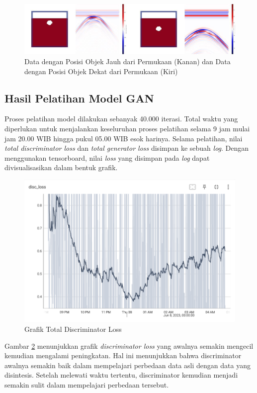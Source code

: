 \documentclass[conference]{IEEEtran}
\begin{document}
\begin{figure}[ht]
  \centering
  \includegraphics[scale=0.2]{gambar/variasi kedalaman.png}
  \caption{Data dengan Posisi Objek Jauh dari Permukaan (Kanan) dan Data dengan Posisi Objek Dekat dari Permukaan (Kiri)}
  \label{fig:posisiData}
\end{figure}

\subsection{Hasil Pelatihan Model GAN}

Proses pelatihan model dilakukan sebanyak 40.000 iterasi. 
Total waktu yang diperlukan untuk menjalankan keseluruhan proses pelatihan selama 9 jam mulai jam 20.00 WIB hingga pukul 05.00 WIB esok harinya. 
Selama pelatihan, nilai \emph{total discriminator loss} dan \emph{total generator loss} disimpan ke sebuah \emph{log}. 
Dengan menggunakan tensorboard, nilai \emph{loss} yang disimpan pada \emph{log} dapat divisualisasikan dalam bentuk grafik. 

\begin{figure}[ht]
  \centering
  \includegraphics[scale=0.4]{gambar/Disc_loss.png}
  \caption{Grafik Total Discriminator Loss}
  \label{fig:discLoss}
\end{figure}

Gambar \ref{fig:discLoss} menunjukkan grafik \emph{discriminator loss} yang awalnya semakin mengecil kemudian mengalami peningkatan. 
Hal ini menunjukkan bahwa discriminator awalnya semakin baik dalam mempelajari perbedaan data asli dengan data yang disintesis. 
Setelah melewati waktu tertentu, discriminator kemudian menjadi semakin sulit dalam mempelajari perbedaan tersebut. 
\end{document}
